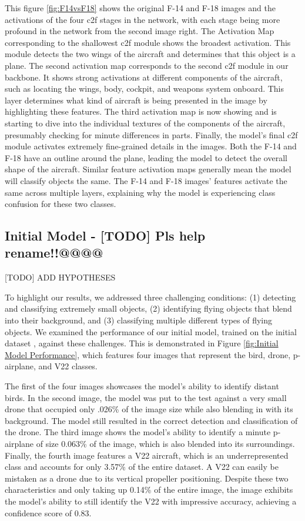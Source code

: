 \documentclass[10pt,twocolumn,letterpaper]{article}
\begin{document}
This figure \ref{fig:F14vsF18} shows the original F-14 and F-18 images and the activations of the four c2f stages in the network, with each stage being more profound in the network from the second image right. The Activation Map corresponding to the shallowest c2f module shows the broadest activation. This module detects the two wings of the aircraft and determines that this object is a plane. The second activation map corresponds to the second c2f module in our backbone. It shows strong activations at different components of the aircraft, such as locating the wings, body, cockpit, and weapons system onboard. This layer determines what kind of aircraft is being presented in the image by highlighting these features. The third activation map is now showing and is starting to dive into the individual textures of the components of the aircraft, presumably checking for minute differences in parts. Finally, the model's final c2f module activates extremely fine-grained details in the images. Both the F-14 and F-18 have an outline around the plane, leading the model to detect the overall shape of the aircraft. Similar feature activation maps generally mean the model will classify objects the same. The F-14 and F-18 images' features activate the same across multiple layers, explaining why the model is experiencing class confusion for these two classes.

\subsection{Initial Model  -  [TODO] Pls help rename!!@@@@}

[TODO] ADD HYPOTHESES

To highlight our results, we addressed three challenging conditions: (1) detecting and classifying extremely small objects, (2) identifying flying objects that blend into their background, and (3) classifying multiple different types of flying objects. We examined the performance of our initial model, trained on the initial dataset \cite{InitialDataset}, against these challenges. This is demonstrated in Figure \ref{fig:Initial Model Performance}, which features four images that represent the bird, drone, p-airplane, and V22 classes.

The first of the four images showcases the model's ability to identify distant birds. In the second image, the model was put to the test against a very small drone that occupied only .026\% of the image size while also blending in with its background. The model still resulted in the correct detection and classification of the drone. The third image shows the model's ability to identify a minute p-airplane of size 0.063\% of the image, which is also blended into its surroundings. Finally, the fourth image features a V22 aircraft, which is an underrepresented class and accounts for only 3.57\% of the entire dataset. A V22 can easily be mistaken as a drone due to its vertical propeller positioning. Despite these two characteristics and only taking up 0.14\% of the entire image, the image exhibits the model's ability to still identify the V22 with impressive accuracy, achieving a confidence score of 0.83.
\end{document}
